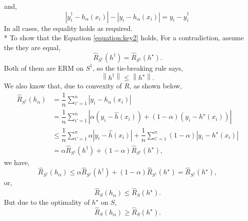 \documentclass{article}
\begin{document}
and,
\begin{equation} 
\left| y^{\dagger}_{i} - h_{\alpha}\left(x_{i}\right) \right| - \left| y_{i} - h_{\alpha}\left(x_{i}\right) \right| = y_{i} - y^{\dagger}_{i.}
\end{equation}
In all cases, the equality holds as required.
\\* To show that the Equation \ref{equation:key2} holds, For a contradiction, assume the they are equal,
\begin{equation} 
\hat{R}_{S^{\dagger}}\left(h^{\dagger}\right) = \hat{R}_{S^{\dagger}}\left(h^\star \right).
\end{equation}
Both of them are ERM on $S^{\dagger}$, so the tie-breaking rule says,
\begin{equation} 
\left\|h^{\dagger}\right\| \leq  \left\|h^\star \right\|.
\end{equation}
We also know that, due to convexity of $\hat{R}$, as shown below,
\begin{align*}
\hat{R}_{S^{\dagger}}\left(h_{\alpha}\right) &= \dfrac{1}{n} \displaystyle\sum_{i'=1}^{n} \left| y_{i} - h_{\alpha}\left(x_{i}\right) \right|
\\ &= \dfrac{1}{n} \displaystyle\sum_{i'=1}^{n} \left| \alpha \left(y_{i} - \hat{h}\left(x_{i}\right)\right) + \left(1 - \alpha\right) \left(y_{i} - h^\star \left(x_{i}\right)\right) \right|
\\ &\leq  \dfrac{1}{n} \displaystyle\sum_{i'=1}^{n} \alpha \left| y_{i} - \hat{h}\left(x_{i}\right) \right| + \dfrac{1}{n} \displaystyle\sum_{i'=1}^{n} \left(1 - \alpha\right) \left| y_{i} - h^\star \left(x_{i}\right) \right|
\\ &= \alpha \hat{R}_{S^{\dagger}}\left(h^{\dagger}\right) + \left(1 - \alpha\right) \hat{R}_{S^{\dagger}}\left(h^\star \right),
\end{align*}
we have,
\begin{equation} 
\hat{R}_{S^{\dagger}}\left(h_{\alpha}\right) \leq  \alpha \hat{R}_{S^{\dagger}}\left(h^{\dagger}\right) + \left(1 - \alpha\right) \hat{R}_{S^{\dagger}}\left(h^\star \right) = \hat{R}_{S^{\dagger}}\left(h^\star \right),
\end{equation}
or,
\begin{equation} 
\hat{R}_{S}\left(h_{\alpha}\right) \leq  \hat{R}_{S}\left(h^\star \right).
\end{equation}
But due to the optimality of $h^\star $ on $S, $
\begin{equation} 
\hat{R}_{S}\left(h_{\alpha}\right) \geq  \hat{R}_{S}\left(h^\star \right).
\end{equation}
\end{document}
